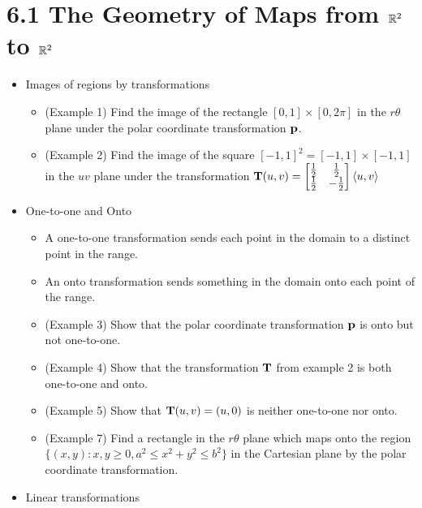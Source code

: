 \documentclass[11pt]{article}
\begin{document}
\section*{6.1 The Geometry of Maps from \(\mathbb R^2\) to \(\mathbb R^2\)}
\begin{itemize}
  \item Images of regions by transformations
    \begin{itemize}
      \item (Example 1) Find the image of the rectangle
            \([0,1]\times[0,2\pi]\) in the \(r\theta\) plane under the
            polar coordinate transformation \(\mathbf{p}\).
      \item (Example 2) Find the image of the square
            \([-1,1]^2=[-1,1]\times[-1,1]\) in the \(uv\) plane under the
            transformation
            \(
              \mathbf{T}(u,v)
                =
              \begin{bmatrix}
                \frac{1}{2} & \frac{1}{2} \\
                \frac{1}{2} & -\frac{1}{2}
              \end{bmatrix}
              \langle u,v\rangle
            \)
    \end{itemize}
  \item One-to-one and Onto
    \begin{itemize}
      \item A one-to-one transformation sends each point in the domain to
            a distinct point in the range.
      \item An onto transformation sends something in the domain onto each
            point of the range.
      \item (Example 3) Show that the polar coordinate transformation
            \(\mathbf{p}\) is onto but not one-to-one.
      \item (Example 4) Show that the transformation \(\mathbf{T}\) from example 2
            is both one-to-one and onto.
      \item (Example 5) Show that \(\mathbf{T}(u,v)=(u,0)\) is neither one-to-one
            nor onto.
      \item (Example 7) Find a rectangle in the \(r\theta\) plane which maps
            onto the region \(\{(x,y):x,y\geq 0,a^2\leq x^2+y^2\leq b^2\}\)
            in the Cartesian plane by the polar coordinate transformation.
    \end{itemize}
  \item Linear transformations
    \begin{itemize}

\end{itemize}
\end{itemize}
\end{document}
